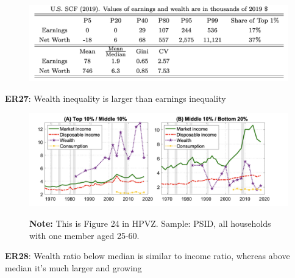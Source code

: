 \documentclass[11pt, aspectratio=169]{beamer}
\begin{document}
\begin{frame}{}
	\begin{figure}
		\includegraphics[scale=0.3]{./figures/inequality_wealth_3}
	\end{figure}

	\vspace{2mm}
	{\color{blue}\textbf{ER27}}: Wealth inequality is larger than earnings inequality
\end{frame}


\begin{frame}{}
	\begin{figure}
		\includegraphics[scale=0.4]{./figures/inequality_consumption_2}
	\vspace*{-2mm}
	\begin{flushleft}
		{\scriptsize \hspace{6mm} \textbf{Note:} This is Figure 24 in HPVZ. Sample: PSID, all households with one member aged 25-60.}
	\end{flushleft}	
	\end{figure}

	\vspace{0mm}
	{\color{blue}\textbf{ER28}}: Wealth ratio below median is similar to income ratio, whereas above median it's much larger and growing 
\end{frame}
\end{document}
